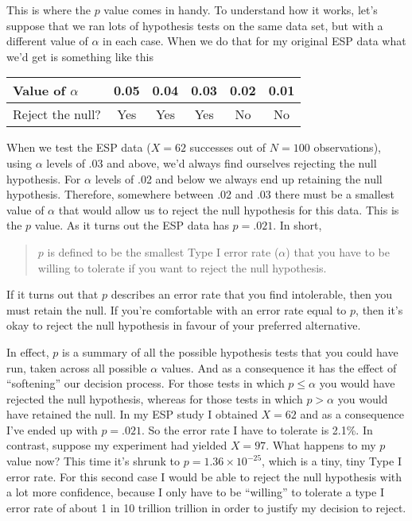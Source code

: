 This is where the $p$ value comes in handy. To understand how it works, let's suppose that we ran lots of hypothesis tests on the same data set, but with a different value of $\alpha$ in each case. When we do that for my original ESP data what we'd get is something like this

\begin{center}
\begin{tabular}{l|ccccc}
Value of $\alpha$ & 0.05 & 0.04 & 0.03 & 0.02 & 0.01 \\ \hline
Reject the null?  & Yes & Yes & Yes & No & No \\
\end{tabular}
\end{center}

\noindent
When we test the ESP data ($X=62$ successes out of $N=100$ observations), using $\alpha$ levels of .03 and above, we'd always find ourselves rejecting the null hypothesis. For $\alpha$ levels of .02 and below we always end up retaining the null hypothesis. Therefore, somewhere between .02 and .03 there must be a smallest value of $\alpha$ that would allow us to reject the null hypothesis for this data. This is the $p$ value. As it turns out the ESP data has $p = .021$. In short,
\begin{quote}
$p$ is defined to be the smallest Type I error rate ($\alpha$) that you have to be willing to tolerate if you want to reject the null hypothesis. 
\end{quote}
If it turns out that $p$ describes an error rate that you find intolerable, then you must retain the null. If you're comfortable with an error rate equal to $p$, then it's okay to reject the null hypothesis in favour of your preferred alternative. 

In effect, $p$ is a summary of all the possible hypothesis tests that you could have run, taken across all possible $\alpha$ values. And as a consequence it has the effect of ``softening'' our decision process. For those tests in which $p \leq \alpha$ you would have rejected the null hypothesis, whereas for those tests in which $p > \alpha$ you would have retained the null. In my ESP study I obtained $X=62$ and as a consequence I've ended up with $p = .021$. So the error rate I have to tolerate is 2.1\%.  In contrast, suppose my experiment had yielded $X=97$. What happens to my $p$ value now? This time it's shrunk to $p = 1.36 \times 10^{-25}$, which is a tiny, tiny Type I error rate. For this second case I would be able to reject the null hypothesis with a lot more confidence, because I only have to be ``willing'' to tolerate a type I error rate of about 1 in 10 trillion trillion in order to justify my decision to reject.

